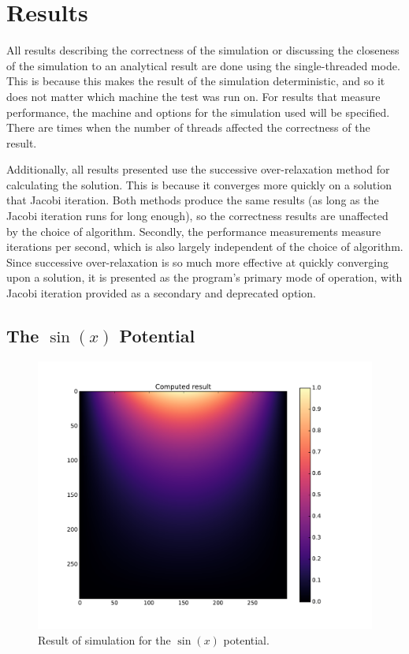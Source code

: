 \section{Results}

All results describing the correctness of the simulation or discussing the closeness of the simulation to an analytical
result are done using the single-threaded mode. This is because this makes the result of the simulation deterministic,
and so it does not matter which machine the test was run on. For results that measure performance, the machine and options
for the simulation used will be specified. There are times when the number of threads affected the correctness of the
result.

Additionally, all results presented use the successive over-relaxation method for calculating the solution. This is because
it converges more quickly on a solution that Jacobi iteration. Both methods produce the same results (as long as the Jacobi
iteration runs for long enough), so the correctness results are unaffected by the choice of algorithm. Secondly, the performance
measurements measure iterations per second, which is also largely independent of the choice of algorithm. Since successive
over-relaxation is so much more effective at quickly converging upon a solution, it is presented as the program's primary
mode of operation, with Jacobi iteration provided as a secondary and deprecated option.

\subsection{The $\sin(x)$ Potential}

	\begin{figure}[h]
	\centering
	\includegraphics[width=1.1\linewidth]{sin300_calc.pdf}
	\caption{Result of simulation for the $\sin(x)$ potential.} 
	\label{fig:sin-result}
	\end{figure}

